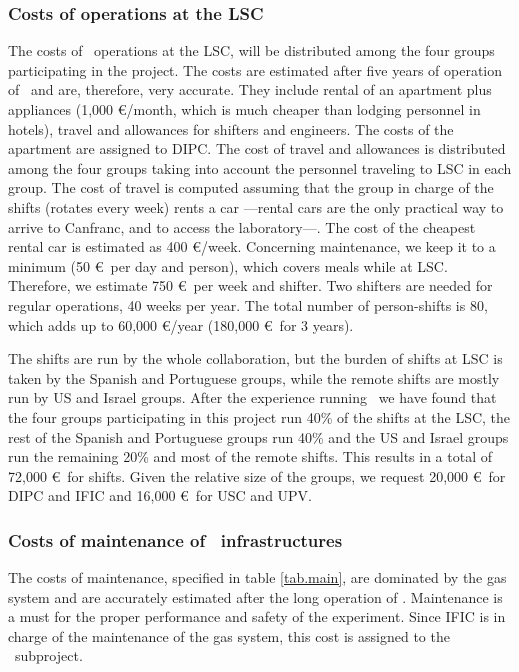 \subsubsection{Costs of operations at the LSC}
\label{sec:operationcost}
The costs of \Next\ operations at the LSC, will be distributed among the four groups participating in the project. The costs are estimated after five years of operation of \New\ and are, therefore, very accurate. They include rental of an apartment plus appliances (1,000 \euro/month, which is much cheaper than lodging personnel in hotels), travel and allowances for shifters and engineers.  The costs of the apartment are assigned to DIPC. The cost of travel and allowances is distributed among the four groups taking into account the personnel traveling to LSC in each group. The cost of travel is computed assuming that the group in charge of the shifts (rotates every week) rents a car ---rental cars are the only practical way to arrive to Canfranc, and to access the laboratory---. The cost of the cheapest rental car is estimated as 400 \euro/week. Concerning maintenance, we keep it to a minimum (50 \euro\ per day and person), which covers meals while at LSC. Therefore, we estimate 750 \euro\ per week and shifter. Two shifters are needed for regular operations, 40 weeks per year. The total number of person-shifts is 80, which adds up to 60,000 \euro/year (180,000 \euro\ for 3 years).

The shifts are run by the whole collaboration, but the burden of shifts at LSC is taken by the Spanish and Portuguese groups, while the remote shifts are mostly run by US and Israel groups. After the experience running \NEW\, we have found that the four groups participating in this project run 40\% of the shifts at the LSC, the rest of the Spanish and Portuguese groups run 40\% and the US and Israel groups run the remaining 20\% and most of the remote shifts. This results in a total of 
72,000 \euro\ for shifts. Given the relative size of the groups, we request 20,000 \euro\ for DIPC and IFIC and 16,000 \euro\ for USC and UPV.

\subsubsection{Costs of maintenance of \Next\ infrastructures}

The costs of maintenance, specified in table \ref{tab.main}, are dominated by the gas system and are accurately estimated after the long operation of \NEW. Maintenance is a must for the proper performance and safety of the experiment. Since IFIC is in charge of the maintenance of the gas system, this cost is assigned to the \sIFIC\ subproject.

